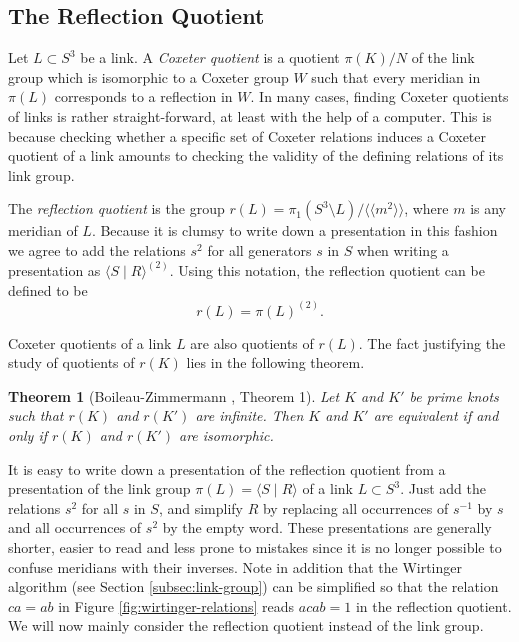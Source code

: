 \documentclass{article}
\newtheorem{theorem}{Theorem}[section]
\theoremstyle{definition}
\begin{document}
\subsection{The Reflection Quotient}\label{subsec:reflection-quotient}
Let $L \subset S^3$ be a link. A \textit{Coxeter quotient} is a quotient $\pi(K)/N$ of the link group which is isomorphic to a Coxeter group $W$ such that every meridian in $\pi(L)$ corresponds to a reflection in $W$.
In many cases, finding Coxeter quotients of links is rather straight-forward, at least with the help of a computer. This is because checking whether a specific set of Coxeter relations induces a Coxeter quotient of a link amounts to checking the validity of the defining relations of its link group.

The \textit{reflection quotient} is the group $r(L) = \pi_1(S^3 \setminus L) / \langle \langle m^2 \rangle \rangle$, where $m$ is any meridian of $L$. Because it is clumsy to write down a presentation in this fashion we agree to add the relations $s^2$ for all generators $s$ in $S$ when writing a presentation as $\langle S \; | \; R \rangle^{(2)}$. Using this notation, the reflection quotient can be defined to be
$$r(L) = \pi(L)^{(2)}.$$

Coxeter quotients of a link $L$ are also quotients of $r(L)$. The fact justifying the study of quotients of $r(K)$ lies in the following theorem.

\begin{theorem}[Boileau-Zimmermann \cite{boileau1989}, Theorem 1]
Let $K$ and $K'$ be prime knots such that $r(K)$ and $r(K')$ are infinite. Then $K$ and $K'$ are equivalent if and only if $r(K)$ and $r(K')$ are isomorphic.
\end{theorem}


It is easy to write down a presentation of the reflection quotient from a presentation of the link group $\pi(L) = \langle S \; | \; R \rangle$ of a link $L \subset S^3$. Just add the relations $s^2$ for all $s$ in $S$, and simplify $R$ by replacing all occurrences of $s^{-1}$ by $s$ and all occurrences of $s^2$ by the empty word. These presentations are generally shorter, easier to read and less prone to mistakes since it is no longer possible to confuse meridians with their inverses.
Note in addition that the Wirtinger algorithm (see Section \ref{subsec:link-group}) can be simplified so that the relation $ca = ab$ in Figure \ref{fig:wirtinger-relations} reads $acab = 1$ in the reflection quotient.
We will now mainly consider the reflection quotient instead of the link group.
\end{document}
